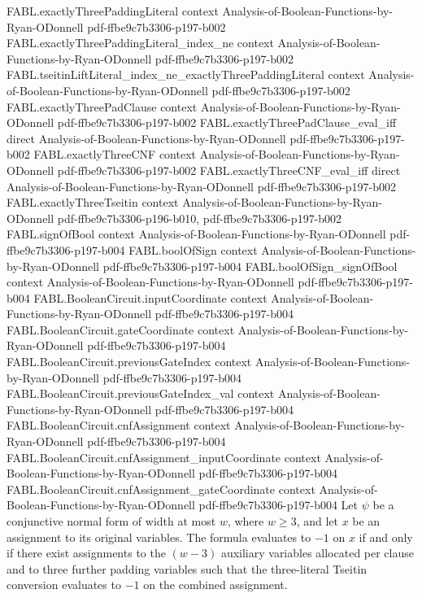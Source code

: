 \begin{theorem}
\proofstep
  {FABL.exactlyThreePaddingLiteral}
  {context}
  {Analysis-of-Boolean-Functions-by-Ryan-ODonnell}
  {pdf-ffbe9c7b3306-p197-b002}
\proofstep
  {FABL.exactlyThreePaddingLiteral_index_ne}
  {context}
  {Analysis-of-Boolean-Functions-by-Ryan-ODonnell}
  {pdf-ffbe9c7b3306-p197-b002}
\proofstep
  {FABL.tseitinLiftLiteral_index_ne_exactlyThreePaddingLiteral}
  {context}
  {Analysis-of-Boolean-Functions-by-Ryan-ODonnell}
  {pdf-ffbe9c7b3306-p197-b002}
\proofstep
  {FABL.exactlyThreePadClause}
  {context}
  {Analysis-of-Boolean-Functions-by-Ryan-ODonnell}
  {pdf-ffbe9c7b3306-p197-b002}
\proofstep
  {FABL.exactlyThreePadClause_eval_iff}
  {direct}
  {Analysis-of-Boolean-Functions-by-Ryan-ODonnell}
  {pdf-ffbe9c7b3306-p197-b002}
\proofstep
  {FABL.exactlyThreeCNF}
  {context}
  {Analysis-of-Boolean-Functions-by-Ryan-ODonnell}
  {pdf-ffbe9c7b3306-p197-b002}
\proofstep
  {FABL.exactlyThreeCNF_eval_iff}
  {direct}
  {Analysis-of-Boolean-Functions-by-Ryan-ODonnell}
  {pdf-ffbe9c7b3306-p197-b002}
\proofstep
  {FABL.exactlyThreeTseitin}
  {context}
  {Analysis-of-Boolean-Functions-by-Ryan-ODonnell}
  {pdf-ffbe9c7b3306-p196-b010,
    pdf-ffbe9c7b3306-p197-b002}
\proofstep
  {FABL.signOfBool}
  {context}
  {Analysis-of-Boolean-Functions-by-Ryan-ODonnell}
  {pdf-ffbe9c7b3306-p197-b004}
\proofstep
  {FABL.boolOfSign}
  {context}
  {Analysis-of-Boolean-Functions-by-Ryan-ODonnell}
  {pdf-ffbe9c7b3306-p197-b004}
\proofstep
  {FABL.boolOfSign_signOfBool}
  {context}
  {Analysis-of-Boolean-Functions-by-Ryan-ODonnell}
  {pdf-ffbe9c7b3306-p197-b004}
\proofstep
  {FABL.BooleanCircuit.inputCoordinate}
  {context}
  {Analysis-of-Boolean-Functions-by-Ryan-ODonnell}
  {pdf-ffbe9c7b3306-p197-b004}
\proofstep
  {FABL.BooleanCircuit.gateCoordinate}
  {context}
  {Analysis-of-Boolean-Functions-by-Ryan-ODonnell}
  {pdf-ffbe9c7b3306-p197-b004}
\proofstep
  {FABL.BooleanCircuit.previousGateIndex}
  {context}
  {Analysis-of-Boolean-Functions-by-Ryan-ODonnell}
  {pdf-ffbe9c7b3306-p197-b004}
\proofstep
  {FABL.BooleanCircuit.previousGateIndex_val}
  {context}
  {Analysis-of-Boolean-Functions-by-Ryan-ODonnell}
  {pdf-ffbe9c7b3306-p197-b004}
\proofstep
  {FABL.BooleanCircuit.cnfAssignment}
  {context}
  {Analysis-of-Boolean-Functions-by-Ryan-ODonnell}
  {pdf-ffbe9c7b3306-p197-b004}
\proofstep
  {FABL.BooleanCircuit.cnfAssignment_inputCoordinate}
  {context}
  {Analysis-of-Boolean-Functions-by-Ryan-ODonnell}
  {pdf-ffbe9c7b3306-p197-b004}
\proofstep
  {FABL.BooleanCircuit.cnfAssignment_gateCoordinate}
  {context}
  {Analysis-of-Boolean-Functions-by-Ryan-ODonnell}
  {pdf-ffbe9c7b3306-p197-b004}
Let $\psi$ be a conjunctive normal form of width at most $w$, where $w\geq 3$, and let
$x$ be an assignment to its original variables. The formula evaluates to $-1$ on $x$ if
and only if there exist assignments to the $(w-3)$ auxiliary variables allocated per
clause and to three further padding variables such that the three-literal Tseitin
conversion evaluates to $-1$ on the combined assignment.
\end{theorem}

